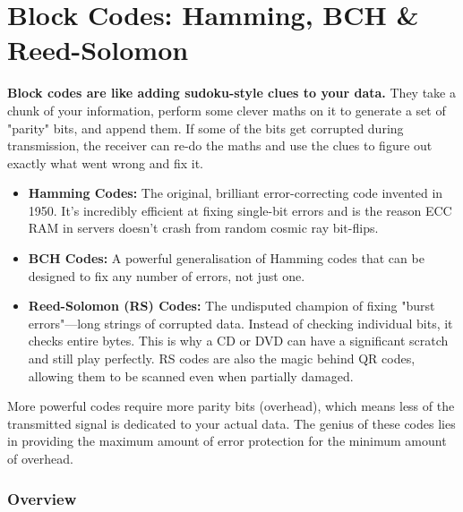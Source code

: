 
\chapter{Block Codes: Hamming, BCH \& Reed-Solomon}
\label{ch:block-codes}

\begin{nontechnical}
    \textbf{Block codes are like adding sudoku-style clues to your data.} They take a chunk of your information, perform some clever maths on it to generate a set of "parity" bits, and append them. If some of the bits get corrupted during transmission, the receiver can re-do the maths and use the clues to figure out exactly what went wrong and fix it.

    \begin{itemize}
        \item \textbf{Hamming Codes:} The original, brilliant error-correcting code invented in 1950. It's incredibly efficient at fixing single-bit errors and is the reason ECC RAM in servers doesn't crash from random cosmic ray bit-flips.
        \item \textbf{BCH Codes:} A powerful generalisation of Hamming codes that can be designed to fix any number of errors, not just one.
        \item \textbf{Reed-Solomon (RS) Codes:} The undisputed champion of fixing "burst errors"---long strings of corrupted data. Instead of checking individual bits, it checks entire bytes. This is why a CD or DVD can have a significant scratch and still play perfectly. RS codes are also the magic behind QR codes, allowing them to be scanned even when partially damaged.
    \end{itemize}

     More powerful codes require more parity bits (overhead), which means less of the transmitted signal is dedicated to your actual data. The genius of these codes lies in providing the maximum amount of error protection for the minimum amount of overhead.
\end{nontechnical}


\subsection{Overview}

